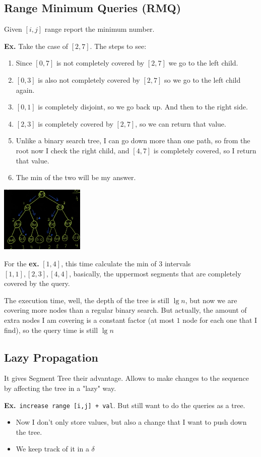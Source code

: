 \documentclass{IEEEtran}
\begin{document}
    \subsection{Range Minimum Queries (RMQ)}
      Given $[i,j]$ range report the minimum number. \par 
      \textbf{Ex.} Take the case of $[2,7]$. The steps to see:
      \begin{enumerate}
        \item Since $[0,7]$ is not completely covered by $[2,7]$ we go to the left child.
        \item $[0,3]$ is also not completely covered by $[2,7]$ so we go to the left child again.
        \item $[0,1]$ is completely disjoint, so we go back up. And then to the right side.
        \item $[2,3]$ is completely covered by $[2,7]$, so we can return that value.
        \item Unlike a binary search tree, I can go down more than one path, so from the root now I check the right child, and $[4,7]$ is completely covered, so I return that value.
        \item The min of the two will be my answer.
      \end{enumerate}
      \begin{center}
        \includegraphics[width=0.30\textwidth]{stExample.png}
      \end{center}
      \par For the \textbf{ex.} $[1,4]$, this time calculate the min of 3 intervals $[1,1],[2,3],[4,4]$, basically, the uppermost segments that are completely covered by the query.\par 
      The execution time, well, the depth of the tree is still $\lg{n}$, but now we are covering more nodes than a regular binary search. But actually, the amount of extra nodes I am covering is a constant factor (at most $1$ node for each one that I find), so the query time is still $\lg{n}$
    \subsection{Lazy Propagation}
      It gives Segment Tree their advantage. Allows to make changes to the sequence by affecting the tree in a "lazy" way.\par 
      \textbf{Ex.} \texttt{increase range [i,j] + val}. But still want to do the queries as a tree.\par 
      \begin{itemize}
        \item Now I don't only store values, but also a change that I want to push down the tree.
        \item We keep track of it in a $\delta$
      \end{itemize}
      
\end{document}
